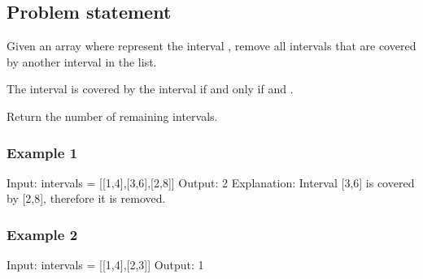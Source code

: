 \documentclass[letterpaper,12pt,english]{book}
\begin{document}
\subsection{Problem statement\sphinxfootnotemark[76]}
\label{\detokenize{Sorting/04_SORT_1288_Remove_Covered_Intervals:problem-statement}}%
\begin{footnotetext}[76]\sphinxAtStartFootnote
{}
%
\end{footnotetext}\ignorespaces 
\sphinxAtStartPar
Given an array  where  represent the interval \sphinxcode{\sphinxupquote{{[}li, ri)}}, remove all intervals that are covered by another interval in the list.

\sphinxAtStartPar
The interval \sphinxcode{\sphinxupquote{{[}a, b)}} is covered by the interval \sphinxcode{\sphinxupquote{{[}c, d)}} if and only if  and .

\sphinxAtStartPar
Return the number of remaining intervals.


\subsubsection{Example 1}
\label{\detokenize{Sorting/04_SORT_1288_Remove_Covered_Intervals:example-1}}
\begin{sphinxVerbatim}[commandchars=\\\{\}]
Input: intervals = [[1,4],[3,6],[2,8]]
Output: 2
Explanation: Interval [3,6] is covered by [2,8], therefore it is removed.
\end{sphinxVerbatim}


\subsubsection{Example 2}
\label{\detokenize{Sorting/04_SORT_1288_Remove_Covered_Intervals:example-2}}
\begin{sphinxVerbatim}[commandchars=\\\{\}]
Input: intervals = [[1,4],[2,3]]
Output: 1
\end{sphinxVerbatim}
\end{document}

